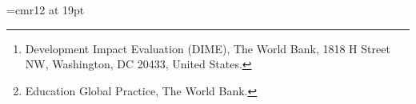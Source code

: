 \documentclass[11pt,a4paper]{article}
\begin{document}
	
	
	\font\myfont=cmr12 at 19pt
	\title{}
	
	\newcommand*\samethanks[1][\value{footnote}]{\footnotemark[#1]}
	
	\author{%
		Caio Piza\thanks{Development Impact Evaluation (DIME), The World Bank, 1818 H Street NW, Washington, DC 20433, United States.}%
		\and Astrid Zwager\samethanks[2]%
		\and Matteo Ruzzante\samethanks[2]%
		\and Rafael Dantas\samethanks[2]%
		\and Andre Loureiro\thanks{Education Global Practice, The World Bank.}
	}
	
	\date{}
	
	\maketitle
	
	\vspace{1cm}
	\listoffigures
	\listoftables
	
	
	\newpage
	\sloppy
	
	\doublespacing
	
	\setlength\parskip{1em}
	\setlength\parindent{0pt}
	
	
	
	\pgfplotsset{compat=1.15}
	
	
	\newpage
	\renewcommand{\thetable}{C\arabic{table}}
	\renewcommand{\thefigure}{C\arabic{figure}}
	
\end{document}
